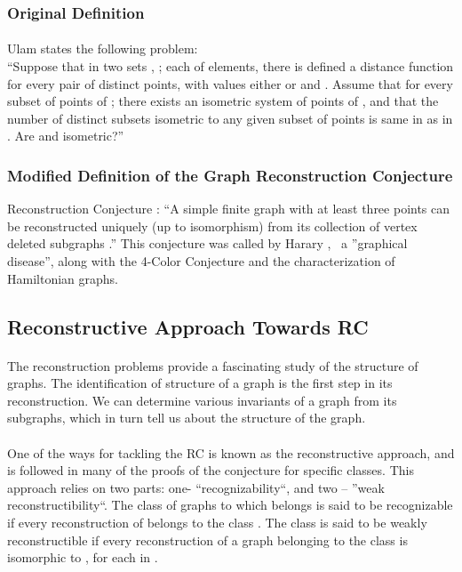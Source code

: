 \documentclass[12pt,conference]{IEEEtran}
\begin{document}
\subsubsection{ Original Definition}
\paragraph*{} Ulam \cite{u1} states the following problem:
\\
``Suppose that in two sets , ; each of  elements, there is defined a distance function  for every pair of distinct points, with values either  or  and . Assume that for every subset of  points of ; there exists an  isometric system of  points of , and that the number of distinct subsets isometric to any given subset of  points  is same in  as in . Are  and  isometric?''

\subsubsection{ Modified Definition of the Graph Reconstruction Conjecture}
Reconstruction Conjecture \cite{h1}: ``A simple finite graph  with at least three points can be reconstructed uniquely (up to isomorphism) from its collection of vertex deleted subgraphs .''  This conjecture was called by Harary  \cite{h1},  a ''graphical disease'', along with the 4-Color Conjecture and the characterization of Hamiltonian graphs.

\subsection{ Reconstructive Approach Towards RC }
\paragraph*{} The reconstruction problems provide a fascinating study of the structure of graphs. The identification of structure of a graph is the first step in its reconstruction. We can determine various invariants of a graph from its subgraphs, which in turn tell us about the structure of the graph.
\paragraph*{} One of the ways for tackling the RC is known as the reconstructive approach, and is followed in many of the proofs of the conjecture for specific classes. This approach relies on two parts: one- ``recognizability``, and two – ''weak reconstructibility``\cite{b3}. The class of graphs  to which  belongs is said to be recognizable if every reconstruction of  belongs to the class . The class  is said to be weakly reconstructible if every reconstruction of a graph  belonging to the class  is isomorphic to , for each  in  \cite{b3}.
\end{document}
